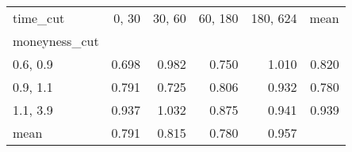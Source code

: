 \begin{tabular}{lrrrrr}
\toprule
time\_cut &  0, 30 &  30, 60 &  60, 180 &  180, 624 &  mean \\
moneyness\_cut &          &           &            &             &       \\
\midrule
0.6, 0.9    &    0.698 &     0.982 &      0.750 &       1.010 & 0.820 \\
0.9, 1.1    &    0.791 &     0.725 &      0.806 &       0.932 & 0.780 \\
1.1, 3.9    &    0.937 &     1.032 &      0.875 &       0.941 & 0.939 \\
mean          &    0.791 &     0.815 &      0.780 &       0.957 &       \\
\bottomrule
\end{tabular}
